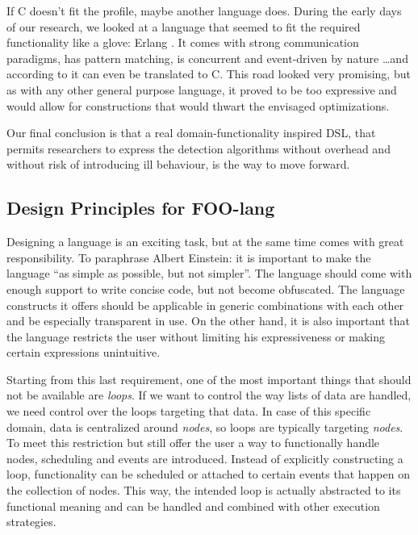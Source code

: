 \documentclass[conference]{IEEEtran}
\begin{document}
If C doesn't fit the profile, maybe another language does. During the early
days of our research, we looked at a language that seemed to fit the required
functionality like a glove: Erlang \cite{armstrong1993concurrent}. It comes
with strong communication paradigms, has pattern matching, is concurrent and
event-driven by nature \dots and according to \cite{wong1998compiling} it can
even be translated to C. This road looked very promising, but as with any other
general purpose language, it proved to be too expressive and would allow for
constructions that would thwart the envisaged optimizations.

Our final conclusion is that a real domain-functionality inspired DSL, that
permits researchers to express the detection algorithms without overhead and
without risk of introducing ill behaviour, is the way to move forward.

\subsection{Design Principles for FOO-lang}
\label{subsection:design}

Designing a language is an exciting task, but at the same time comes with great
responsibility. To paraphrase Albert Einstein: it is important to make the
language ``as simple as possible, but not simpler''. The language should come
with enough support to write concise code, but not become obfuscated. The
language constructs it offers should be applicable in generic combinations with
each other and be especially transparent in use. On the other hand, it is also
important that the language restricts the user without limiting his
expressiveness or making certain expressions unintuitive.

Starting from this last requirement, one of the most important things that
should not be available are \emph{loops}. If we want to control the way lists
of data are handled, we need control over the loops targeting that data. In
case of this specific domain, data is centralized around \emph{nodes}, so loops
are typically targeting \emph{nodes}. To meet this restriction but still offer
the user a way to functionally handle nodes, scheduling and events are
introduced. Instead of explicitly constructing a loop, functionality can be
scheduled or attached to certain events that happen on the collection of nodes.
This way, the intended loop is actually abstracted to its functional meaning
and can be handled and combined with other execution strategies.
\end{document}

